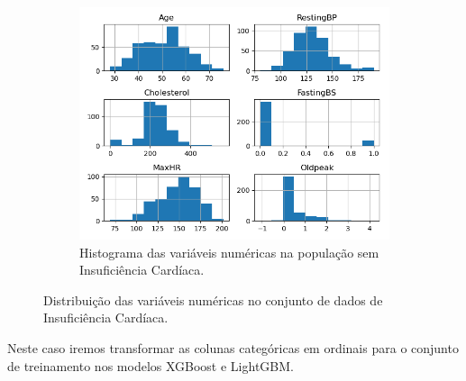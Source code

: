\begin{figure}[H]
     \hfill
     \begin{subfigure}[b]{0.3\textwidth}
 \caption{Histograma das variáveis numéricas na população sem Insuficiência Cardíaca.}
 \label{fig:var:3:card}
 \centering
\includegraphics[scale=0.3]{images/hist_heart_no.png}
     \end{subfigure}
        \caption{Distribuição das variáveis numéricas no conjunto de dados de Insuficiência Cardíaca.}
         \label{fig:var:card:t}
\end{figure}

Neste caso iremos transformar as colunas categóricas em ordinais para o conjunto de treinamento nos modelos XGBoost e LightGBM.

